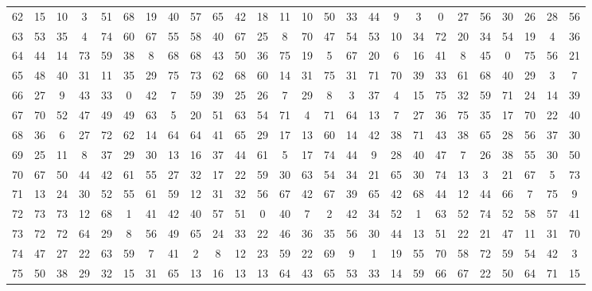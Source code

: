 \begin{table}
\begin{tabular}{c c c c c c c c c c c c c c c c c c c c c c c c c c }
62 & 15 & 10 & 3 & 51 & 68 & 19 & 40 & 57 & 65 & 42 & 18 & 11 & 10 & 50 & 33 & 44 & 9 & 3 & 0 & 27 & 56 & 30 & 26 & 28 & 56 \\
63 & 53 & 35 & 4 & 74 & 60 & 67 & 55 & 58 & 40 & 67 & 25 & 8 & 70 & 47 & 54 & 53 & 10 & 34 & 72 & 20 & 34 & 54 & 19 & 4 & 36 \\
64 & 44 & 14 & 73 & 59 & 38 & 8 & 68 & 68 & 43 & 50 & 36 & 75 & 19 & 5 & 67 & 20 & 6 & 16 & 41 & 8 & 45 & 0 & 75 & 56 & 21 \\
65 & 48 & 40 & 31 & 11 & 35 & 29 & 75 & 73 & 62 & 68 & 60 & 14 & 31 & 75 & 31 & 71 & 70 & 39 & 33 & 61 & 68 & 40 & 29 & 3 & 7 \\
66 & 27 & 9 & 43 & 33 & 0 & 42 & 7 & 59 & 39 & 25 & 26 & 7 & 29 & 8 & 3 & 37 & 4 & 15 & 75 & 32 & 59 & 71 & 24 & 14 & 39 \\
67 & 70 & 52 & 47 & 49 & 49 & 63 & 5 & 20 & 51 & 63 & 54 & 71 & 4 & 71 & 64 & 13 & 7 & 27 & 36 & 75 & 35 & 17 & 70 & 22 & 40 \\
68 & 36 & 6 & 27 & 72 & 62 & 14 & 64 & 64 & 41 & 65 & 29 & 17 & 13 & 60 & 14 & 42 & 38 & 71 & 43 & 38 & 65 & 28 & 56 & 37 & 30 \\
69 & 25 & 11 & 8 & 37 & 29 & 30 & 13 & 16 & 37 & 44 & 61 & 5 & 17 & 74 & 44 & 9 & 28 & 40 & 47 & 7 & 26 & 38 & 55 & 30 & 50 \\
70 & 67 & 50 & 44 & 42 & 61 & 55 & 27 & 32 & 17 & 22 & 59 & 30 & 63 & 54 & 34 & 21 & 65 & 30 & 74 & 13 & 3 & 21 & 67 & 5 & 73 \\
71 & 13 & 24 & 30 & 52 & 55 & 61 & 59 & 12 & 31 & 32 & 56 & 67 & 42 & 67 & 39 & 65 & 42 & 68 & 44 & 12 & 44 & 66 & 7 & 75 & 9 \\
72 & 73 & 73 & 12 & 68 & 1 & 41 & 42 & 40 & 57 & 51 & 0 & 40 & 7 & 2 & 42 & 34 & 52 & 1 & 63 & 52 & 74 & 52 & 58 & 57 & 41 \\
73 & 72 & 72 & 64 & 29 & 8 & 56 & 49 & 65 & 24 & 33 & 22 & 46 & 36 & 35 & 56 & 30 & 44 & 13 & 51 & 22 & 21 & 47 & 11 & 31 & 70 \\
74 & 47 & 27 & 22 & 63 & 59 & 7 & 41 & 2 & 8 & 12 & 23 & 59 & 22 & 69 & 9 & 1 & 19 & 55 & 70 & 58 & 72 & 59 & 54 & 42 & 3 \\
75 & 50 & 38 & 29 & 32 & 15 & 31 & 65 & 13 & 16 & 13 & 13 & 64 & 43 & 65 & 53 & 33 & 14 & 59 & 66 & 67 & 22 & 50 & 64 & 71 & 15 \\
\hline
\end{tabular}
\end{table}